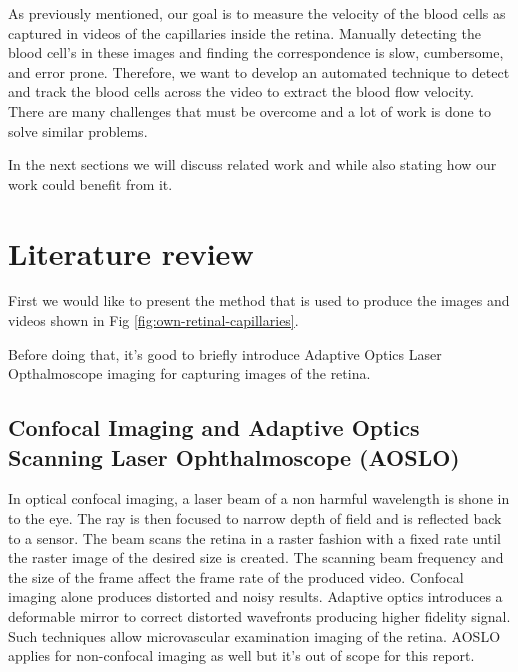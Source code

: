 \documentclass[]{article}
\begin{document}
As previously mentioned, our goal is to measure the velocity of the blood cells as captured in videos of the capillaries inside the retina.
Manually detecting the blood cell's in these images and finding the correspondence is slow, cumbersome, and error prone.
Therefore, we want to develop an automated technique to detect and track the blood cells across the video to extract the blood flow velocity.
There are many challenges that must be overcome and a lot of work is done to solve similar problems.

In the next sections we will discuss related work and while also stating how our work could benefit from it.


\section{Literature review}
First we would like to present the method that is used to produce the images and videos shown in Fig \ref{fig:own-retinal-capillaries}.

Before doing that, it's good to briefly introduce Adaptive Optics Laser Opthalmoscope imaging for capturing images of the retina.

\subsection*{Confocal Imaging and Adaptive Optics Scanning Laser Ophthalmoscope (AOSLO)}

In optical confocal imaging, a laser beam of a non harmful wavelength is shone in to the eye. 
The ray is then focused to narrow depth of field and is reflected back to a sensor.
The beam scans the retina in a raster fashion with a fixed rate until the raster image
of the desired size is created.
The scanning beam frequency and the size of the frame affect the frame rate of the 
produced video.
Confocal imaging alone produces distorted and noisy results.
Adaptive optics introduces a deformable mirror to correct distorted wavefronts producing higher fidelity signal.
Such techniques allow microvascular examination imaging of the retina\cite{chui_use_2012}.
AOSLO applies for non-confocal imaging as well but it's out of scope for this report.
\end{document}
